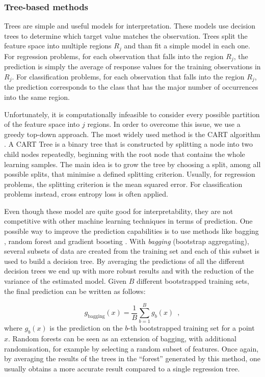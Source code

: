 \subsubsection{Tree-based methods} \label{Tree-based methods}

Trees are simple and useful models for interpretation. These models use decision trees to determine which target value matches the observation. Trees split the feature space into multiple regions $R_j$ and than fit a simple model in each one. For regression problems, for each observation that falls into the region $R_j$, the prediction is simply the average of response values for the training observations in $R_j$. For classification problems, for each observation that falls into the region $R_j$, the prediction corresponds to the class that has the major number of occurrences into the same region.   

Unfortunately, it is computationally infeasible to consider every possible partition of the feature space into $j$ regions. In order to overcome this issue, we use a greedy top-down approach. The most widely used method is the CART algorithm \citep{breiman2017classification}. A CART Tree is a binary tree that is constructed by splitting a node into two child nodes repeatedly, beginning with the root node that contains the whole learning samples. The main idea is to grow the tree by choosing a split, among all possible splits, that minimise a defined splitting criterion. Usually, for regression problems, the splitting criterion is the mean squared error. For classification problems instead, cross entropy loss is often applied. 

Even though these model are quite good for interpretability, they are not competitive with other machine learning techniques in terms of prediction. One possible way to improve the prediction capabilities is to use methods like bagging  \citep{breiman1996bagging}, random forest \citep{breiman2001random} and gradient boosting \citep{friedman2001greedy}.
With \textit{bagging } (bootstrap aggregating), several subsets of data are created from the training set and each of this subset is used to build a decision tree. By averaging the predictions of all the different decision trees we end up with more robust results and with the reduction of the variance of the estimated model. Given $B$ different bootstrapped training sets, the final prediction can be written as follows: 

\begin{equation*}
    g_\mathrm{bagging}(x) = \frac{1}{B}\sum_{b=1}^B g_b(x)
    \enspace,
\end{equation*}
where $g_b(x)$ is the prediction on the $b$-th bootstrapped training set for a point $x$.
Random forests can be seen as an extension of bagging, with additional randomisation, for example by selecting a random subset of features. Once again, by averaging the results of the trees in the “forest” generated by this method, one usually obtains a more accurate result compared to a single regression tree. 

